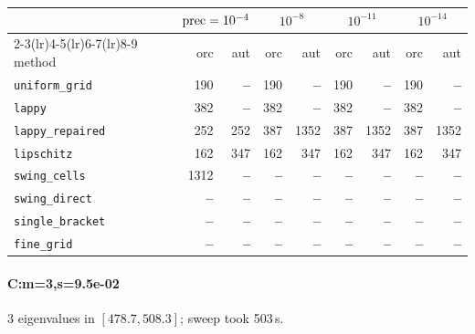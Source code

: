\begin{center}
\small
\begin{tabular}{lrrrrrrrr}
\toprule
& \multicolumn{2}{c}{$\mathrm{prec}=10^{-4}$} & \multicolumn{2}{c}{$10^{-8}$} & \multicolumn{2}{c}{$10^{-11}$} & \multicolumn{2}{c}{$10^{-14}$} \\
\cmidrule(lr){2-3}\cmidrule(lr){4-5}\cmidrule(lr){6-7}\cmidrule(lr){8-9}
method & orc & aut & orc & aut & orc & aut & orc & aut \\
\midrule
\texttt{uniform\_grid} & 190 & \textbf{--} & 190 & \textbf{--} & 190 & \textbf{--} & 190 & \textbf{--} \\
\texttt{lappy} & 382 & \textbf{--} & 382 & \textbf{--} & 382 & \textbf{--} & 382 & \textbf{--} \\
\texttt{lappy\_repaired} & 252 & 252 & 387 & 1352 & 387 & 1352 & 387 & 1352 \\
\texttt{lipschitz} & 162 & 347 & 162 & 347 & 162 & 347 & 162 & 347 \\
\texttt{swing\_cells} & 1312 & \textbf{--} & \textbf{--} & \textbf{--} & \textbf{--} & \textbf{--} & \textbf{--} & \textbf{--} \\
\texttt{swing\_direct} & \textbf{--} & \textbf{--} & \textbf{--} & \textbf{--} & \textbf{--} & \textbf{--} & \textbf{--} & \textbf{--} \\
\midrule
\texttt{single\_bracket} & \textbf{--} & \textbf{--} & \textbf{--} & \textbf{--} & \textbf{--} & \textbf{--} & \textbf{--} & \textbf{--} \\
\texttt{fine\_grid} & \textbf{--} & \textbf{--} & \textbf{--} & \textbf{--} & \textbf{--} & \textbf{--} & \textbf{--} & \textbf{--} \\
\bottomrule
\end{tabular}
\end{center}

\paragraph{C:m=3,s=9.5e-02} 3 eigenvalues in $[478.7, 508.3]$; sweep took 503\,s.

